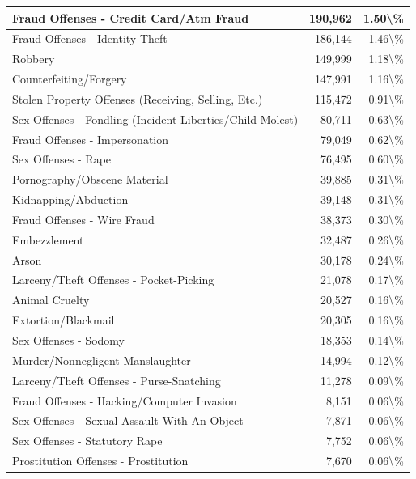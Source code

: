 \documentclass[
]{krantz}
\begin{document}
\begin{longtable}[t]{l|r|r}
\hline
Fraud Offenses - Credit Card/Atm Fraud & 190,962 & 1.50\textbackslash{}\%\\
\hline
Fraud Offenses - Identity Theft & 186,144 & 1.46\textbackslash{}\%\\
\hline
Robbery & 149,999 & 1.18\textbackslash{}\%\\
\hline
Counterfeiting/Forgery & 147,991 & 1.16\textbackslash{}\%\\
\hline
Stolen Property Offenses (Receiving, Selling, Etc.) & 115,472 & 0.91\textbackslash{}\%\\
\hline
Sex Offenses - Fondling (Incident Liberties/Child Molest) & 80,711 & 0.63\textbackslash{}\%\\
\hline
Fraud Offenses - Impersonation & 79,049 & 0.62\textbackslash{}\%\\
\hline
Sex Offenses - Rape & 76,495 & 0.60\textbackslash{}\%\\
\hline
Pornography/Obscene Material & 39,885 & 0.31\textbackslash{}\%\\
\hline
Kidnapping/Abduction & 39,148 & 0.31\textbackslash{}\%\\
\hline
Fraud Offenses - Wire Fraud & 38,373 & 0.30\textbackslash{}\%\\
\hline
Embezzlement & 32,487 & 0.26\textbackslash{}\%\\
\hline
Arson & 30,178 & 0.24\textbackslash{}\%\\
\hline
Larceny/Theft Offenses - Pocket-Picking & 21,078 & 0.17\textbackslash{}\%\\
\hline
Animal Cruelty & 20,527 & 0.16\textbackslash{}\%\\
\hline
Extortion/Blackmail & 20,305 & 0.16\textbackslash{}\%\\
\hline
Sex Offenses - Sodomy & 18,353 & 0.14\textbackslash{}\%\\
\hline
Murder/Nonnegligent Manslaughter & 14,994 & 0.12\textbackslash{}\%\\
\hline
Larceny/Theft Offenses - Purse-Snatching & 11,278 & 0.09\textbackslash{}\%\\
\hline
Fraud Offenses - Hacking/Computer Invasion & 8,151 & 0.06\textbackslash{}\%\\
\hline
Sex Offenses - Sexual Assault With An Object & 7,871 & 0.06\textbackslash{}\%\\
\hline
Sex Offenses - Statutory Rape & 7,752 & 0.06\textbackslash{}\%\\
\hline
Prostitution Offenses - Prostitution & 7,670 & 0.06\textbackslash{}\%\\
\hline

\end{longtable}
\end{document}
